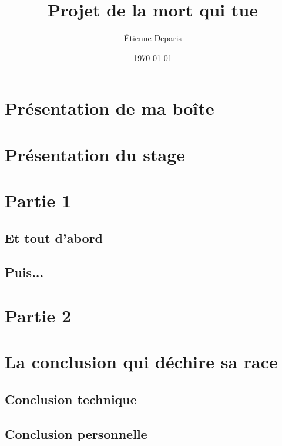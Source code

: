 \documentclass[a4paper,12pt]{report}
\title{Projet de la mort qui tue}
\author{Étienne Deparis}
\date{\today}
\begin{document}
\renewcommand{\labelitemi}{\large\textcolor{othergreen}{\fg}}
\groovypdtitre
\restoregeometry

\tableofcontents

\chapter{Présentation de ma boîte}

\lipsum[1-2]

\chapter{Présentation du stage}

\lipsum[1-2]

\chapter{Partie 1}
\section{Et tout d'abord}

\lipsum[1]

\section{Puis...}

\lipsum[2]

\chapter{Partie 2}

\lipsum[1-2]

\chapter[Conclusion]{La conclusion qui déchire sa race}

\lipsum[1-2]

\section*{Conclusion technique}

\lipsum[1-2]

\section*{Conclusion personnelle}

\lipsum[1-2]
\end{document}
